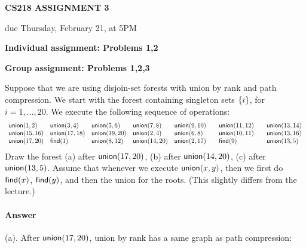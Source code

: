 \documentclass[11pt]{article}
\newcommand{\Union}{\mbox{\sf union}}
\newcommand{\Find}{\mbox{\sf find}}
\begin{document}
\centerline{\large \bf CS218 ASSIGNMENT 3}
\centerline{due Thursday, February 21, at 5PM}

\vskip 0.3in
\noindent
\bf{Individual assignment: Problems 1,2}

\noindent
\bf{Group assignment: Problems 1,2,3}

\vskip 0.2in




\begin{problem}
Suppose that we are using disjoin-set forests with union by rank and path compression. We start with the forest containing singleton sets ${\left\{ i \right\} }$, for $i = 1,\dots,20$. We execute the following sequence of operations:
%
\noindent
{\small
\begin{eqnarray*}
\begin{array}{lllllll}
\Union(1,2)\quad & \Union(3,4)\quad &\Union(5,6) \quad
    &\Union(7,8)\quad & \Union(9,10) \quad & \Union(11,12)\quad &\Union(13,14) \\
%
\Union(15,16) & \Union(17,18) &\Union(19,20) & \Union(2,4) & \Union(6,8) 
 	& \Union(10,11) & \Union(13,16) \\
%
 \Union(17,20) 	&  \Find(1) & \Union(8,12)  & \Union(14, 20)
	 & \Union(2,17) & \Find(9) &  \Union(13,5)
\end{array}
\end{eqnarray*}
}
%
Draw the forest (a) after $\Union(17,20)$, (b) after $\Union(14,20)$, (c) after $\Union(13,5)$. Assume that whenever we execute $\Union(x,y)$, then we first do $\Find(x)$, $\Find(y)$, and then the union for the roots. (This slightly differs from the lecture.)
\end{problem}

\paragraph{Answer}
(a). After $\Union(17,20)$, union by rank has a same graph as path compression:

\end{document}

